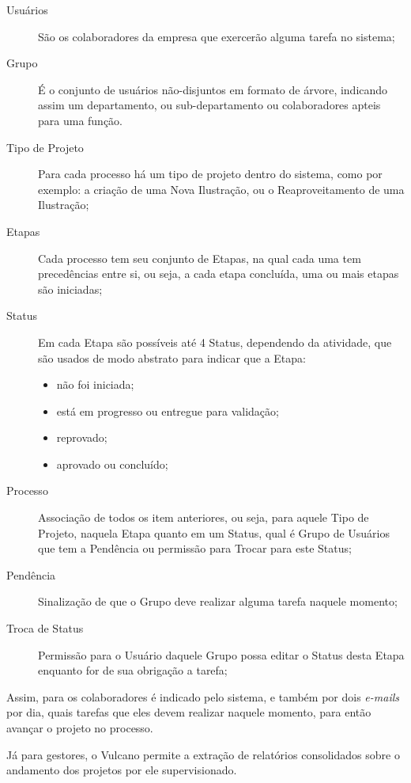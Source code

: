 \documentclass[
  12pt,				%
  openany,
  oneside,
  a4paper,			%
  english,			%
  brazil
]{article}
\numberwithin{figure}{section}
\numberwithin{table}{section}
\begin{document}
\begin{description}
	\item[Usuários] São os colaboradores da empresa que exercerão alguma tarefa no sistema;
	\item[Grupo] É o conjunto de usuários não-disjuntos em formato de árvore, indicando assim um departamento, ou sub-departamento ou colaboradores apteis para uma função.
	\item[Tipo de Projeto] Para cada processo há um tipo de projeto dentro do sistema, como por exemplo: a criação de uma Nova Ilustração, ou o Reaproveitamento de uma Ilustração;
	\item[Etapas] Cada processo tem seu conjunto de Etapas, na qual cada uma tem precedências entre si, ou seja, a cada etapa concluída, uma ou mais etapas são iniciadas;
	\item[Status] Em cada Etapa são possíveis até 4 Status, dependendo da atividade, que são usados de modo abstrato para indicar que a Etapa: 
		\vspace{-10mm}
		\begin{singlespace}
			\begin{itemize}
				\item não foi iniciada;
				\item está em progresso ou entregue para validação;
				\item reprovado;
				\item aprovado ou concluído;
			\end{itemize}
		\end{singlespace}
		\vspace{-5mm}
	\item[Processo] Associação de todos os item anteriores, ou seja, para aquele Tipo de Projeto, naquela Etapa quanto em um Status, qual é Grupo de Usuários que tem a Pendência ou permissão para Trocar para este Status;
	\item[Pendência] Sinalização de que o Grupo deve realizar alguma tarefa naquele momento;
	\item[Troca de Status] Permissão para o Usuário daquele Grupo possa editar o Status desta Etapa enquanto for de sua obrigação a tarefa;
\end{description}

Assim, para os colaboradores é indicado pelo sistema, e também por dois \textit{e-mails} por dia, quais tarefas que eles devem realizar naquele momento, para então avançar o projeto no processo.

Já para gestores, o Vulcano permite a extração de relatórios consolidados sobre o andamento dos projetos por ele supervisionado.
\end{document}
